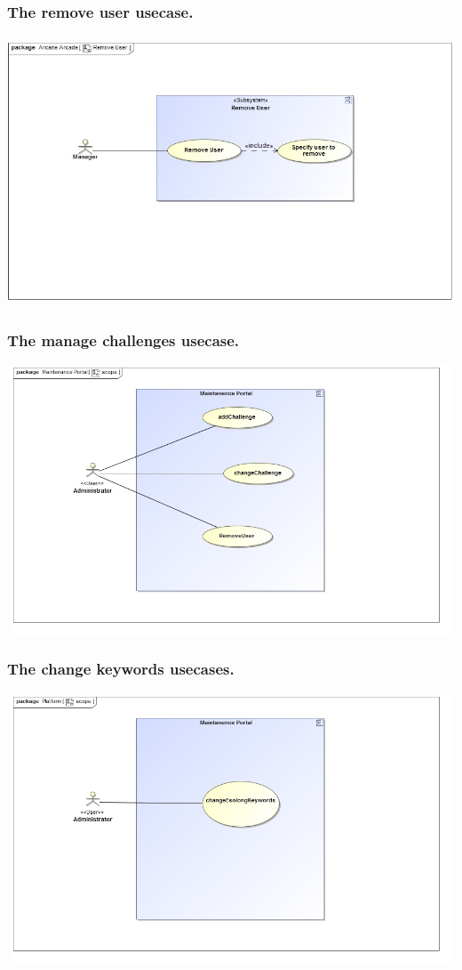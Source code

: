 \documentclass[english]{article}
\begin{document}
		\subsubsection* {The remove user usecase.}
		\includegraphics[width=14cm,height=8cm,keepaspectratio]{removeUser.jpg}
		
		\subsubsection* {The manage challenges usecase.}
		\includegraphics[width=14cm,height=8cm,keepaspectratio]{Challenge.jpg}		
		
		\subsubsection* {The change keywords usecases.}
		\includegraphics[width=14cm,height=8cm,keepaspectratio]{keyWords.jpg}		
		
\end{document}
